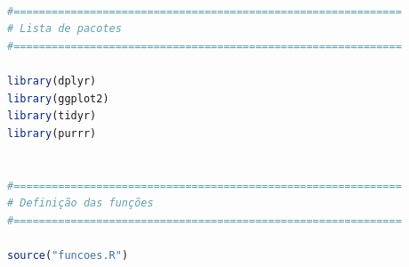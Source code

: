 \begin{lstlisting}[language=R, caption={Simulação e extração das Méticas de similaridade da TEF e TFT}, label={lst:simulacao_tef_tft}]

#=============================================================
# Lista de pacotes 
#=============================================================

library(dplyr)
library(ggplot2)
library(tidyr)
library(purrr)


#=============================================================
# Definição das funções
#=============================================================

source("funcoes.R")
\end{lstlisting}
